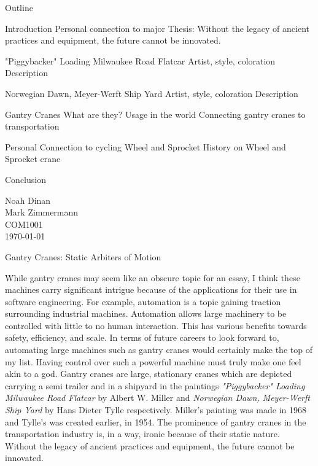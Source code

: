 \documentclass[12pt]{article}
\begin{document}

\begin{center}
Outline
\end{center}

\begin{outline}[enumerate]
\1 Introduction
    \2 Personal connection to major
    \2 Thesis: Without the legacy of ancient practices and equipment, the future cannot be innovated.

\1 "Piggybacker" Loading Milwaukee Road Flatcar
    \2 Artist, style, coloration
    \2 Description

\1 Norwegian Dawn, Meyer-Werft Ship Yard
    \2 Artist, style, coloration
    \2 Description

\1 Gantry Cranes
    \2 What are they?
    \2 Usage in the world
    \2 Connecting gantry cranes to transportation

\1 Personal Connection to cycling
    \2 Wheel and Sprocket
    \2 History on Wheel and Sprocket crane

\1 Conclusion

\end{outline}

\newpage
{}

\noindent
Noah Dinan \\ Mark Zimmermann \\ COM1001 \\ \today \\

\begin{center}
Gantry Cranes: Static Arbiters of Motion
\end{center}

\setlength{\parindent}{0.5in}

While gantry cranes may seem like an obscure topic for an essay, I think these machines carry significant intrigue because of the applications for
their use in software engineering. For example, automation is a topic gaining traction surrounding industrial machines.
Automation allows large machinery to be controlled with little to no 
human interaction. This has various benefits towards safety, efficiency, and scale. In terms of future careers to look forward to, automating large machines such
as gantry cranes would certainly make the top of my list. Having control over such a powerful machine must truly make one feel akin to a god.
Gantry cranes are large, stationary cranes which are depicted carrying a semi trailer and in a shipyard
in the paintings \textit{"Piggybacker" Loading Milwaukee Road Flatcar} by Albert W. Miller and \textit{Norwegian Dawn, Meyer-Werft Ship Yard} by 
Hans Dieter Tylle respectively. Miller's painting was made in 1968 and Tylle's was created earlier, in 1954.
The prominence of gantry cranes in the transportation industry is, in a way, ironic because of their static nature.
Without the legacy of ancient practices and equipment, the future cannot be innovated.
\end{document}
